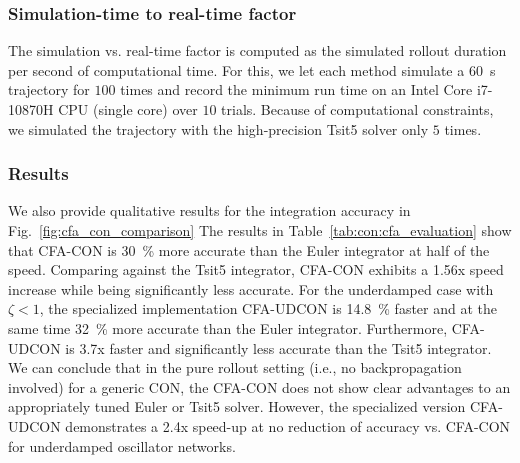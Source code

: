 \subsubsection{Simulation-time to real-time factor} 
The simulation vs. real-time factor is computed as the simulated rollout duration per second of computational time. For this, we let each method simulate a \SI{60}{s} trajectory for $100$ times and record the minimum run time on an Intel Core i7-10870H CPU (single core) over $10$ trials. Because of computational constraints, we simulated the trajectory  with the high-precision Tsit5 solver only $5$ times. 


\subsubsection{Results}
We also provide qualitative results for the integration accuracy in Fig.~\ref{fig:cfa_con_comparison}
The results in Table~\ref{tab:con:cfa_evaluation} show that \gls{CFA-CON} is \SI{30}{\percent} more accurate than the Euler integrator at half of the speed. Comparing against the Tsit5 integrator, \gls{CFA-CON} exhibits a 1.56x speed increase while being significantly less accurate.
For the underdamped case with $\zeta < 1$, the specialized implementation \gls{CFA-UDCON} is \SI{14.8}{\percent} faster and at the same time \SI{32}{\percent} more accurate than the Euler integrator. Furthermore, \gls{CFA-UDCON} is 3.7x faster and significantly less accurate than the Tsit5 integrator.
We can conclude that in the pure rollout setting (i.e., no backpropagation involved) for a generic \gls{CON}, the \gls{CFA-CON} does not show clear advantages to an appropriately tuned Euler or Tsit5 solver. However, the specialized version \gls{CFA-UDCON} demonstrates a 2.4x speed-up at no reduction of accuracy vs. \gls{CFA-CON} for underdamped oscillator networks.


